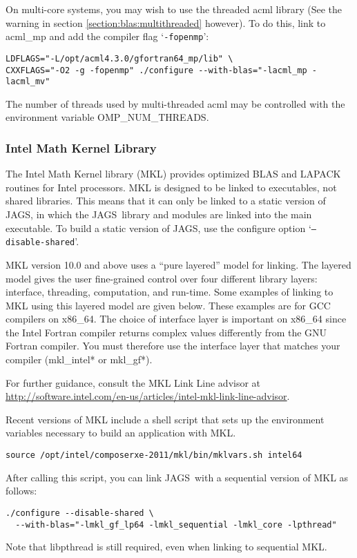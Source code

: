\documentclass[11pt, a4paper, titlepage]{article}
\newcommand{\JAGS}{\textsf{JAGS}}
\newcommand{\code}[1]{{\bgroup{\normalfont\ttfamily #1}\egroup}}
\newcommand{\samp}[1]{{`\bgroup\normalfont\texttt{#1}'\egroup}}
\let\option=\samp
\begin{document}
On multi-core systems, you may wish to use the threaded acml library
(See the warning in section \ref{section:blas:multithreaded} however).
To do this, link to \code{acml\_mp} and add the compiler flag
\option{-fopenmp}:
\begin{verbatim}
LDFLAGS="-L/opt/acml4.3.0/gfortran64_mp/lib" \
CXXFLAGS="-O2 -g -fopenmp" ./configure --with-blas="-lacml_mp -lacml_mv" 
\end{verbatim}
The number of threads used by multi-threaded acml may be controlled
with the environment variable \code{OMP\_NUM\_THREADS}.

\subsubsection{Intel Math Kernel Library}

The Intel Math Kernel library (MKL) provides optimized BLAS and LAPACK
routines for Intel processors.  MKL is designed to be linked to
executables, not shared libraries. This means that it can only be
linked to a static version of \JAGS, in which the \JAGS\ library and
modules are linked into the main executable. To build a static version
of \JAGS, use the configure option \option{--disable-shared}.

MKL version 10.0 and above uses a ``pure layered'' model for linking.
The layered model gives the user fine-grained control over four
different library layers: interface, threading, computation, and
run-time. Some examples of linking to MKL using this layered model are
given below. These examples are for GCC compilers on
\code{x86\_64}. The choice of interface layer is important on
\code{x86\_64} since the Intel Fortran compiler returns complex values
differently from the GNU Fortran compiler. You must therefore use the
interface layer that matches your compiler (\code{mkl\_intel*} or
\code{mkl\_gf*}).

For further guidance, consult the MKL Link Line advisor at
\url{http://software.intel.com/en-us/articles/intel-mkl-link-line-advisor}.

Recent versions of MKL include a shell script that sets up the
environment variables necessary to build an application with MKL.
\begin{verbatim}
source /opt/intel/composerxe-2011/mkl/bin/mklvars.sh intel64
\end{verbatim}

After calling this script, you can link \JAGS\ with a sequential
version of MKL as follows:
\begin{verbatim}
./configure --disable-shared \
  --with-blas="-lmkl_gf_lp64 -lmkl_sequential -lmkl_core -lpthread"
\end{verbatim}
Note that \code{libpthread} is still required, even when linking
to sequential MKL.
\end{document}

